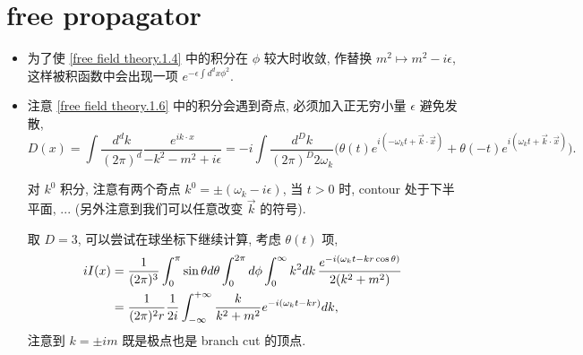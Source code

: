 \section{free propagator}
\begin{itemize}
	\item 为了使 \eqref{free field theory.1.4} 中的积分在 $\phi$ 较大时收敛, 作替换 $m^2 \mapsto m^2 - i \epsilon$, 这样被积函数中会出现一项 $e^{- \epsilon \int d^d x \phi^2}$.
	
	\item 注意 \eqref{free field theory.1.6} 中的积分会遇到奇点, 必须加入正无穷小量 $\epsilon$ 避免发散,
	\begin{equation} \label{free field theory.2.1}
		D(x) = \int \frac{d^d k}{(2 \pi)^d} \frac{e^{i k \cdot x}}{- k^2 - m^2 + i \epsilon} = - i \int \frac{d^D k}{(2 \pi)^D 2 \omega_k} \Big( \theta(t) e^{i (- \omega_k t + \vec{k} \cdot \vec{x})} + \theta(- t) e^{i (\omega_k t + \vec{k} \cdot \vec{x})} \Big).
	\end{equation}
	
	\begin{tcolorbox}[title=calculation:]
		对 $k^0$ 积分, 注意有两个奇点 $k^0 = \pm (\omega_k - i \epsilon)$, 当 $t > 0$ 时, contour 处于下半平面, ... (另外注意到我们可以任意改变 $\vec{k}$ 的符号).
		
		取 $D = 3$, 可以尝试在球坐标下继续计算, 考虑 $\theta(t)$ 项,
		\begin{align}
			i I(x) &= \frac{1}{(2 \pi)^3} \int_0^\pi \sin \theta d\theta \int_0^{2 \pi} d\phi \int_0^\infty k^2 dk \, \frac{e^{- i (\omega_k t - k r \cos \theta)}}{2 (k^2 + m^2)} \notag \\
			&= \frac{1}{(2 \pi)^2 r} \frac{1}{2 i} \int_{- \infty}^{+ \infty} \frac{k}{k^2 + m^2} e^{- i (\omega_k t - k r)} dk,
		\end{align}
		注意到 $k = \pm i m$ 既是极点也是 branch cut 的顶点.
		

\end{tcolorbox}
\end{itemize}
